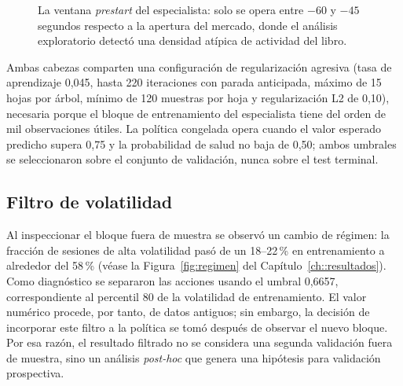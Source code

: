 \begin{figure}[h]
\centering
{}
\caption{La ventana \emph{prestart} del especialista: solo se opera entre $-60$ y $-45$
segundos respecto a la apertura del mercado, donde el análisis exploratorio detectó una
densidad atípica de actividad del libro.}
\label{fig:prestart}
\end{figure} Ambas cabezas comparten una
configuración de regularización agresiva (tasa de aprendizaje 0,045, hasta 220 iteraciones
con parada anticipada, máximo de 15 hojas por árbol, mínimo de 120 muestras por hoja y
regularización L2 de 0,10), necesaria porque el bloque de entrenamiento del especialista
tiene del orden de mil observaciones útiles. La política congelada opera cuando el valor
esperado predicho supera 0,75 y la probabilidad de salud no baja de 0,50; ambos umbrales se
seleccionaron sobre el conjunto de validación, nunca sobre el test terminal.

\subsection{Filtro de volatilidad}

Al inspeccionar el bloque fuera de muestra se observó un cambio de régimen: la fracción de
sesiones de alta volatilidad pasó de un 18--22\,\% en entrenamiento a alrededor del 58\,\%
(véase la Figura~\ref{fig:regimen} del Capítulo~\ref{ch::resultados}). Como diagnóstico se
separaron las acciones usando el umbral 0,6657, correspondiente al percentil 80 de la
volatilidad de entrenamiento. El valor numérico procede, por tanto, de datos antiguos; sin
embargo, la decisión de incorporar este filtro a la política se tomó después de observar el
nuevo bloque. Por esa razón, el resultado filtrado no se considera una segunda validación
fuera de muestra, sino un análisis \emph{post-hoc} que genera una hipótesis para validación
prospectiva.

